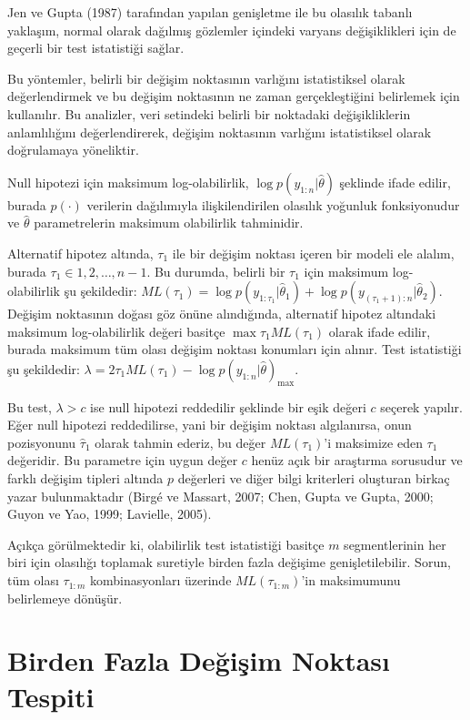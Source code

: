 \documentclass[12pt,twoside]{deuthesis}
\begin{document}
Jen ve Gupta (1987) tarafından yapılan genişletme ile bu olasılık tabanlı yaklaşım, normal olarak dağılmış gözlemler içindeki varyans değişiklikleri için de geçerli bir test istatistiği sağlar.

Bu yöntemler, belirli bir değişim noktasının varlığını istatistiksel olarak değerlendirmek ve bu değişim noktasının ne zaman gerçekleştiğini belirlemek için kullanılır. Bu analizler, veri setindeki belirli bir noktadaki değişikliklerin anlamlılığını değerlendirerek, değişim noktasının varlığını istatistiksel olarak doğrulamaya yöneliktir.

Null hipotezi için maksimum log-olabilirlik, \(\log p(y_{1:n}|\hat{\theta})\) şeklinde ifade edilir, burada \(p(\cdot)\) verilerin dağılımıyla ilişkilendirilen olasılık yoğunluk fonksiyonudur ve \(\hat{\theta}\) parametrelerin maksimum olabilirlik tahminidir.

Alternatif hipotez altında, \(\tau_1\) ile bir değişim noktası içeren bir modeli ele alalım, burada \(\tau_1 \in {1, 2, \dots, n - 1}\). Bu durumda, belirli bir \(\tau_1\) için maksimum log-olabilirlik şu şekildedir: \(ML(\tau_1) = \log p(y_{1:\tau_1}|\hat{\theta}_1) + \log p(y_{(\tau_1+1):n}|\hat{\theta}_2)\). Değişim noktasının doğası göz önüne alındığında, alternatif hipotez altındaki maksimum log-olabilirlik değeri basitçe \(\max{\tau_1} ML(\tau_1)\) olarak ifade edilir, burada maksimum tüm olası değişim noktası konumları için alınır. Test istatistiği şu şekildedir: \(\lambda = 2\tau_1 ML(\tau_1) - \log p(y_{1:n}|\hat{\theta})_{\max}\).

Bu test, \(\lambda > c\) ise null hipotezi reddedilir şeklinde bir eşik değeri \(c\) seçerek yapılır. Eğer null hipotezi reddedilirse, yani bir değişim noktası algılanırsa, onun pozisyonunu \(\hat{\tau}_1\) olarak tahmin ederiz, bu değer \(ML(\tau_1)\)'i maksimize eden \(\tau_1\) değeridir. Bu parametre için uygun değer \(c\) henüz açık bir araştırma sorusudur ve farklı değişim tipleri altında \(p\) değerleri ve diğer bilgi kriterleri oluşturan birkaç yazar bulunmaktadır (Birgé ve Massart, 2007; Chen, Gupta ve Gupta, 2000; Guyon ve Yao, 1999; Lavielle, 2005).

Açıkça görülmektedir ki, olabilirlik test istatistiği basitçe \(m\) segmentlerinin her biri için olasılığı toplamak suretiyle birden fazla değişime genişletilebilir. Sorun, tüm olası \(\tau_{1:m}\) kombinasyonları üzerinde \(ML(\tau_{1:m})\)'in maksimumunu belirlemeye dönüşür.

\section{Birden Fazla Değişim Noktası Tespiti}\label{birden-fazla-deux11fiux15fim-noktasux131-tespiti}
\end{document}
